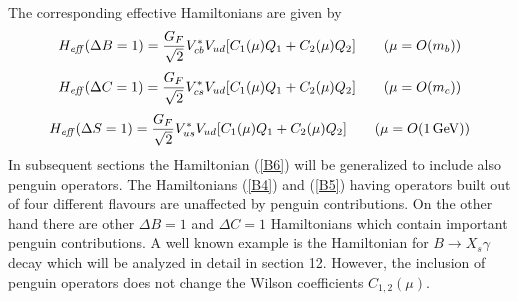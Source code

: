 \documentclass[12pt]{article}
\newcommand{\gev}{\, {\rm GeV}}
\begin{document}
\begin{itemize}
\begin{itemize}
The corresponding  effective Hamiltonians are given by
\begin{equation}\label{B4}
H_{\it eff}(\Delta B=1)=\frac{G_F}{\sqrt{2}}V_{cb}^{*}V_{ud}
\lbrack C_1(\mu) Q_1+C_2(\mu)Q_2 \rbrack
\qquad
(\mu=O(m_b))
\end{equation}
\begin{equation}\label{B5}
H_{\it eff}(\Delta C=1)=\frac{G_F}{\sqrt{2}}V_{cs}^{*}V_{ud}
\lbrack C_1(\mu) Q_1+C_2(\mu)Q_2 \rbrack
\qquad
(\mu=O(m_c))
\end{equation}
\begin{equation}\label{B6}
H_{\it eff}(\Delta S=1)=\frac{G_F}{\sqrt{2}}V_{us}^{*}V_{ud}
\lbrack C_1(\mu) Q_1+C_2(\mu)Q_2 \rbrack
\qquad
(\mu=O(1\gev))
\end{equation}
In subsequent sections the Hamiltonian (\ref{B6}) will be
generalized to include also penguin operators. 
The Hamiltonians (\ref{B4}) and (\ref{B5}) having operators
built out of four different flavours are unaffected by
penguin contributions. On the other hand there are other
$\Delta B=1$ and $\Delta C=1$ Hamiltonians which contain
important penguin contributions. A well known example is
the Hamiltonian for $B\to X_s\gamma$ decay which will be
analyzed in detail in section 12.
However, the inclusion of penguin operators does not
change the Wilson coefficients $C_{1,2}(\mu)$.


\end{itemize}
\end{itemize}
\end{document}
